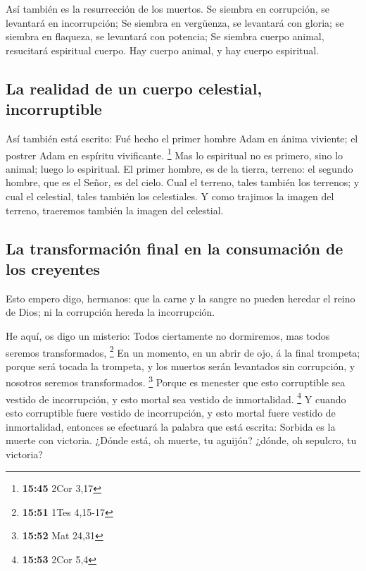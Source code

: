  Así también es la resurrección de los muertos. Se siembra
en corrupción, se levantará en incorrupción;  Se siembra en
vergüenza, se levantará con gloria; se siembra en flaqueza, se levantará
con potencia;  Se siembra cuerpo animal, resucitará
espiritual cuerpo. Hay cuerpo animal, y hay cuerpo espiritual.

\hypertarget{la-realidad-de-un-cuerpo-celestial-incorruptible}{%
\subsection{La realidad de un cuerpo celestial,
incorruptible}\label{la-realidad-de-un-cuerpo-celestial-incorruptible}}

 Así también está escrito: Fué hecho el primer hombre Adam
en ánima viviente; el postrer Adam en espíritu vivificante. \footnote{\textbf{15:45}
  2Cor 3,17}  Mas lo espiritual no es primero, sino lo
animal; luego lo espiritual.  El primer hombre, es de la
tierra, terreno: el segundo hombre, que es el Señor, es del cielo.
 Cual el terreno, tales también los terrenos; y cual el
celestial, tales también los celestiales.  Y como trajimos
la imagen del terreno, traeremos también la imagen del celestial.

\hypertarget{la-transformaciuxf3n-final-en-la-consumaciuxf3n-de-los-creyentes}{%
\subsection{La transformación final en la consumación de los
creyentes}\label{la-transformaciuxf3n-final-en-la-consumaciuxf3n-de-los-creyentes}}

 Esto empero digo, hermanos: que la carne y la sangre no
pueden heredar el reino de Dios; ni la corrupción hereda la
incorrupción.

 He aquí, os digo un misterio: Todos ciertamente no
dormiremos, mas todos seremos transformados, \footnote{\textbf{15:51}
  1Tes 4,15-17}  En un momento, en un abrir de ojo, á la
final trompeta; porque será tocada la trompeta, y los muertos serán
levantados sin corrupción, y nosotros seremos transformados. \footnote{\textbf{15:52}
  Mat 24,31}  Porque es menester que esto corruptible sea
vestido de incorrupción, y esto mortal sea vestido de inmortalidad.
\footnote{\textbf{15:53} 2Cor 5,4}  Y cuando esto
corruptible fuere vestido de incorrupción, y esto mortal fuere vestido
de inmortalidad, entonces se efectuará la palabra que está escrita:
Sorbida es la muerte con victoria.  ¿Dónde está, oh muerte,
tu aguijón? ¿dónde, oh sepulcro, tu victoria?

